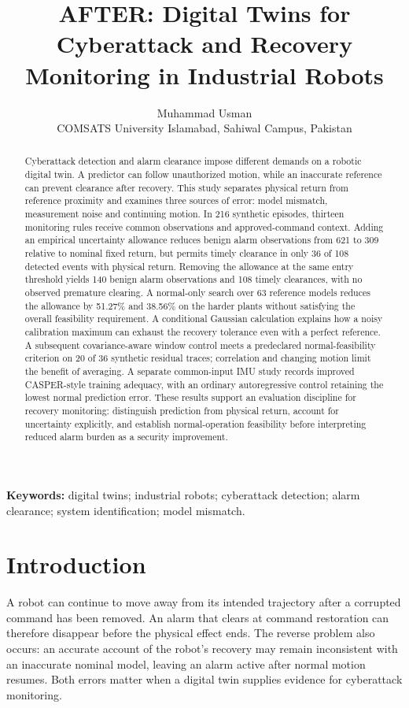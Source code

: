 \documentclass[11pt]{article}
\title{AFTER: Digital Twins for Cyberattack and Recovery Monitoring in Industrial Robots}
\author{Muhammad Usman\\[4pt]\small COMSATS University Islamabad, Sahiwal Campus, Pakistan}
\date{}
\begin{document}
\maketitle
\begin{abstract}
Cyberattack detection and alarm clearance impose different demands on a robotic digital twin. A predictor can follow unauthorized motion, while an inaccurate reference can prevent clearance after recovery. This study separates physical return from reference proximity and examines three sources of error: model mismatch, measurement noise and continuing motion. In 216 synthetic episodes, thirteen monitoring rules receive common observations and approved-command context. Adding an empirical uncertainty allowance reduces benign alarm observations from 621 to 309 relative to nominal fixed return, but permits timely clearance in only 36 of 108 detected events with physical return. Removing the allowance at the same entry threshold yields 140 benign alarm observations and 108 timely clearances, with no observed premature clearing. A normal-only search over 63 reference models reduces the allowance by 51.27\% and 38.56\% on the harder plants without satisfying the overall feasibility requirement. A conditional Gaussian calculation explains how a noisy calibration maximum can exhaust the recovery tolerance even with a perfect reference. A subsequent covariance-aware window control meets a predeclared normal-feasibility criterion on 20 of 36 synthetic residual traces; correlation and changing motion limit the benefit of averaging. A separate common-input IMU study records improved CASPER-style training adequacy, with an ordinary autoregressive control retaining the lowest normal prediction error. These results support an evaluation discipline for recovery monitoring: distinguish prediction from physical return, account for uncertainty explicitly, and establish normal-operation feasibility before interpreting reduced alarm burden as a security improvement.
\end{abstract}
\noindent\textbf{Keywords:} digital twins; industrial robots; cyberattack detection; alarm clearance; system identification; model mismatch.

\section{Introduction}
A robot can continue to move away from its intended trajectory after a corrupted command has been removed. An alarm that clears at command restoration can therefore disappear before the physical effect ends. The reverse problem also occurs: an accurate account of the robot's recovery may remain inconsistent with an inaccurate nominal model, leaving an alarm active after normal motion resumes. Both errors matter when a digital twin supplies evidence for cyberattack monitoring.
\end{document}

